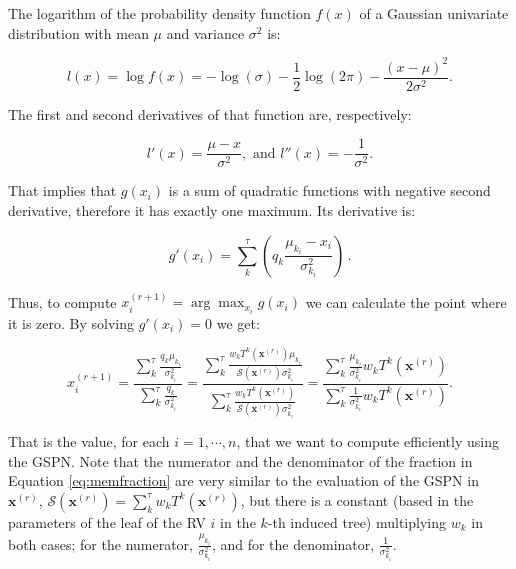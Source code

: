 \documentclass[12pt]{article}
\begin{document}
The logarithm of the probability density function $f(x)$ of a Gaussian univariate distribution with mean $\mu$ and variance $\sigma^2$ is:

\begin{equation}
  l(x) = \log{f(x)} = -\log(\sigma) - \frac{1}{2} \log(2\pi) - \frac{(x-\mu)^2}{2\sigma^2}.
\end{equation}

The first and second derivatives of that function are, respectively:

\begin{equation}
  l'(x)  =  \frac{\mu - x}{\sigma^2}, \text{ and }
  l''(x)  =  -\frac{1}{\sigma^2}.
\end{equation}

\noindent That implies that $g(x_i)$ is a sum of quadratic functions with negative second derivative, therefore it has exactly one maximum. Its derivative is:

\begin{equation}
  g'(x_i) = \sum_k^\tau \left( q_k \frac{\mu_{k_i} - x_i}{\sigma_{k_i}^2} \right) \, .
\end{equation}

\noindent Thus, to compute $x^{(r+1)}_i = \arg\max_{x_i} g(x_i)$ we can calculate the point where it is zero. By solving $g'(x_i) = 0$ we get:

\begin{equation} \label{eq:memfraction}
  x^{(r+1)}_i = \frac{\sum_k^\tau \frac{q_k \mu_{k_i}}{\sigma_{k_i}^2}}{\sum_k^\tau \frac{q_k}{\sigma_{k_i}^2}} 
  = \frac{\sum_k^\tau \frac{w_k T^k(\mathbf{x}^{(r)}) \mu_{k_i}}{\mathcal{S}(\mathbf{x}^{(r)}) \sigma_{k_i}^2}}{\sum_k^\tau \frac{w_k T^k(\mathbf{x}^{(r)})}{\mathcal{S}(\mathbf{x}^{(r)}) \sigma_{k_i}^2}} 
   =   \frac{\sum_k^\tau \frac{\mu_{k_i}}{\sigma_{k_i}^2} w_k T^k(\mathbf{x}^{(r)})}{\sum_k^\tau \frac{1}{\sigma_{k_i}^2} w_k T^k(\mathbf{x}^{(r)})}. 
\end{equation}

That is the value, for each $i = 1, \cdots, n$, that we want to compute efficiently using the GSPN. Note that the numerator and the denominator of the fraction in Equation \ref{eq:memfraction} are very similar to the evaluation of the GSPN in $\mathbf{x}^{(r)}$, $\mathcal{S}(\mathbf{x}^{(r)}) = \sum_k^\tau w_k T^k(\mathbf{x}^{(r)})$, but there is a constant (based in the parameters of the leaf of the RV $i$ in the $k$-th induced tree) multiplying $w_k$ in both cases; for the numerator, $\frac{\mu_{k_i}}{\sigma^2_{k_i}}$, and for the denominator, $\frac{1}{\sigma^2_{k_i}}$.
\end{document}
